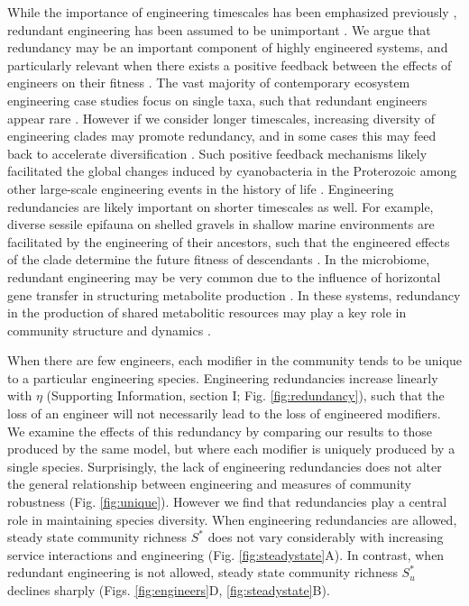 \documentclass[9pt,twocolumn,twoside]{pnas-new}
\begin{document}
While the importance of engineering timescales has been emphasized previously \cite{Hastings2007}, redundant engineering has been assumed to be unimportant \cite{Lawton1994}.
We argue that redundancy may be an important component of highly engineered systems, and particularly relevant when there exists a positive feedback between the effects of engineers on their fitness \cite{Cuddington2004}.
The vast majority of contemporary ecosystem engineering case studies focus on single taxa, such that redundant engineers appear rare \cite{Lawton1994}.
However if we consider longer timescales, increasing diversity of engineering clades may promote redundancy, and in some cases this may feed back to accelerate diversification \cite{OdlingSmee2013b}.
Such positive feedback mechanisms likely facilitated the global changes induced by cyanobacteria in the Proterozoic \cite{Erwin2008,Schirrmeister2013} among other large-scale engineering events in the history of life \cite{Erwin2008}.
Engineering redundancies are likely important on shorter timescales as well.
For example, diverse sessile epifauna on shelled gravels in shallow marine environments are facilitated by the engineering of their ancestors, such that the engineered effects of the clade determine the future fitness of descendants \cite{Kidwell1986}.
In the microbiome, redundant engineering may be very common due to the influence of horizontal gene transfer in structuring metabolite production \cite{Polz2013}.
In these systems, redundancy in the production of shared metabolitic resources may play a key role in community structure and dynamics \cite{Kallus2017,Muscarella2017}.




When there are few engineers, each modifier in the community tends to be unique to a particular engineering species.
Engineering redundancies increase linearly with $\eta$ (Supporting Information, section I; Fig. \ref{fig:redundancy}), such that the loss of an engineer will not necessarily lead to the loss of engineered modifiers. %
We examine the effects of this redundancy by comparing our results to those produced by the same model, but where each modifier is uniquely produced by a single species.
Surprisingly, the lack of engineering redundancies does not alter the general relationship between engineering and measures of community robustness (Fig. \ref{fig:unique}).
However we find that redundancies play a central role in maintaining species diversity.
When engineering redundancies are allowed, steady state community richness $S^*$ does not vary considerably with increasing service interactions and engineering (Fig. \ref{fig:steadystate}A).
In contrast, when redundant engineering is not allowed, steady state community richness $S^*_u$ declines sharply (Figs. \ref{fig:engineers}D, \ref{fig:steadystate}B).
\end{document}
